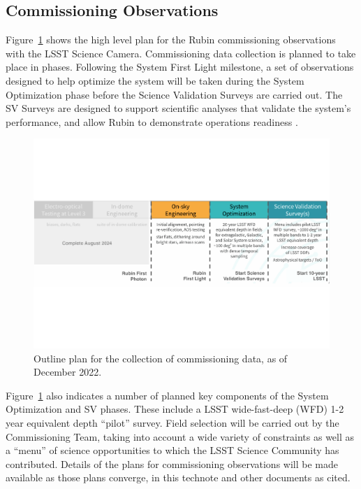 
\subsection{Commissioning Observations}
\label{ssec:commissioning-observations}

Figure~\ref{fig:commissioning} shows the high level plan for the Rubin commissioning observations with the LSST Science Camera.
Commissioning data collection is planned to take place in phases.
Following the System First Light milestone, a set of observations designed to help optimize the system will be taken during the System Optimization phase before the Science Validation Surveys are carried out. 
The SV Surveys are designed to support scientific analyses that validate the system's performance, and allow Rubin to demonstrate operations readiness \citep{SITCOMTN-005}.

\begin{figure}[htb]
\includegraphics[width=\linewidth]{figures/commissioning-plan}
\caption{Outline plan for the collection of commissioning data, as of December 2022.}
\label{fig:commissioning}
\end{figure}

Figure~\ref{fig:commissioning} also indicates a number of planned key components of the System Optimization and SV phases.
These include a LSST wide-fast-deep (WFD) 1-2 year equivalent depth ``pilot'' survey.
Field selection will be carried out by the Commissioning Team, taking into account a wide variety of constraints as well as a ``menu'' of science opportunities to which the LSST Science Community has contributed.
Details of the plans for commissioning observations will be made available as those plans converge, in this technote and other documents as cited.





